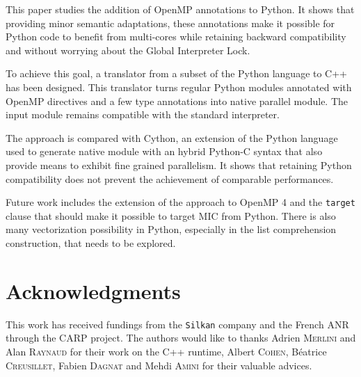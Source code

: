 \documentclass{llncs}
\begin{document}
This paper studies the addition  of OpenMP annotations to Python. It shows that
providing minor semantic adaptations, these annotations make it possible for
Python code to benefit from multi-cores while retaining backward compatibility
and without worrying about the Global Interpreter Lock.

To achieve this goal, a translator from a subset of the Python language to C++
has been designed. This translator turns regular Python modules annotated with
OpenMP directives and a few type annotations into native parallel module. The
input module remains compatible with the standard interpreter.

The approach is compared with Cython, an extension of the Python language used
to generate native module with an hybrid Python-C syntax that also provide means
to exhibit fine grained parallelism. It shows that retaining Python
compatibility does not prevent the achievement of comparable performances.

Future work includes the extension of the approach to OpenMP 4 and the
\texttt{target} clause that should make it possible to target MIC from Python.
There is also many vectorization possibility in Python, especially in the list
comprehension construction, that needs to be explored.

\section*{Acknowledgments}

This work has received fundings from the \texttt{Silkan} company and the French
ANR through the CARP project. The authors would like to thanks Adrien
\textsc{Merlini} and Alan \textsc{Raynaud} for their work on the C++ runtime,
Albert \textsc{Cohen}, B{\'e}atrice \textsc{Creusillet}, Fabien
\textsc{Dagnat} and Mehdi \textsc{Amini} for their valuable advices.



\end{document}
